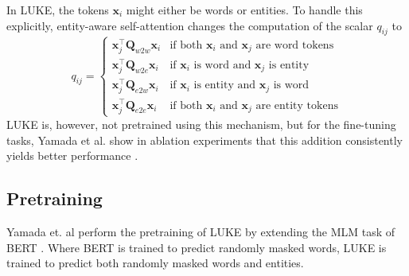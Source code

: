 \documentclass[main.tex]{subfiles}
\begin{document}
In LUKE, the tokens $\mathbf x_i$ might either be words or entities.
To handle this explicitly, entity-aware self-attention changes the computation of the scalar $q_{ij}$ to
\begin{equation}
    q_{ij} = 
    \begin{cases}
    \mathbf x_j^\top \mathbf Q_{w2w} \mathbf x_i  & \text{if both $\mathbf x_i$ and $\mathbf x_j$ are word tokens}\\
    \mathbf x_j^\top \mathbf Q_{w2e} \mathbf x_i & \text{if $\mathbf x_i$ is word and $\mathbf x_j$ is entity}\\
    \mathbf x_j^\top \mathbf Q_{e2w} \mathbf x_i & \text{if $\mathbf x_i$ is entity and $\mathbf x_j$ is word}\\
    \mathbf x_j^\top \mathbf Q_{e2e} \mathbf x_i & \text{if both $\mathbf x_i$ and $\mathbf x_j$ are entity tokens}
    \end{cases}
\end{equation}
LUKE is, however, not pretrained using this mechanism, but for the fine-tuning tasks, Yamada et al. show in ablation experiments that this addition consistently yields better performance \cite[Sec. 5.2]{yamada2020luke}.

\subsection{Pretraining}
Yamada et. al perform the pretraining of LUKE by extending the MLM task of BERT \cite{devlin2019bert}.
Where BERT is trained to predict randomly masked words, LUKE is trained to predict both randomly masked words and entities.




\end{document}
